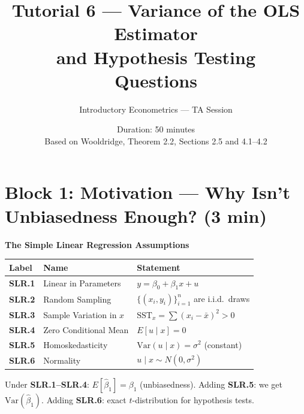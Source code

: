\documentclass[11pt,a4paper]{article}
\title{\textbf{Tutorial 6 --- Variance of the OLS Estimator\\ and Hypothesis Testing}\\\medskip \Large Questions}
\author{Introductory Econometrics --- TA Session}
\date{Duration: 50 minutes \\ \medskip \small Based on Wooldridge, Theorem 2.2, Sections 2.5 and 4.1--4.2}
\begin{document}
\maketitle
\thispagestyle{empty}

\section{Block 1: Motivation --- Why Isn't Unbiasedness Enough? \textnormal{(3 min)}}

\begin{bookexample}
\textbf{\color{blockcolor}The Simple Linear Regression Assumptions}

\medskip
\renewcommand{\arraystretch}{1.4}
\begin{tabular}{lll}
\toprule
\textbf{Label} & \textbf{Name} & \textbf{Statement} \\
\midrule
\textbf{SLR.1} & Linear in Parameters & $y = \beta_0 + \beta_1 x + u$ \\
\textbf{SLR.2} & Random Sampling & $\{(x_i, y_i)\}_{i=1}^n$ are i.i.d.\ draws \\
\textbf{SLR.3} & Sample Variation in $x$ & $\text{SST}_x = \sum (x_i - \bar{x})^2 > 0$ \\
\textbf{SLR.4} & Zero Conditional Mean & $E[u \mid x] = 0$ \\
\textbf{SLR.5} & Homoskedasticity & $\text{Var}(u \mid x) = \sigma^2$ (constant) \\
\textbf{SLR.6} & Normality & $u \mid x \sim N(0, \sigma^2)$ \\
\bottomrule
\end{tabular}
\renewcommand{\arraystretch}{1.0}

\medskip
Under \textbf{SLR.1--SLR.4}: $E[\hat{\beta}_1] = \beta_1$ (unbiasedness). Adding \textbf{SLR.5}: we get $\text{Var}(\hat{\beta}_1)$. Adding \textbf{SLR.6}: exact $t$-distribution for hypothesis tests.
\end{bookexample}
\end{document}
